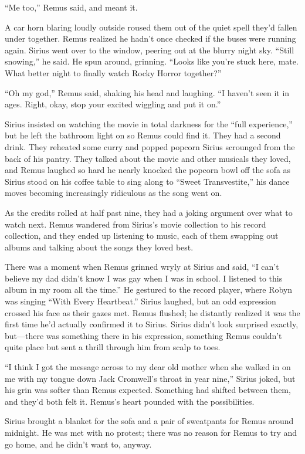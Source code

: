 “Me too,” Remus said, and meant it.

A car horn blaring loudly outside roused them out of the quiet spell they’d fallen under together. Remus realized he hadn’t once checked if the buses were running again. Sirius went over to the window, peering out at the blurry night sky. “Still snowing,” he said. He spun around, grinning. “Looks like you’re stuck here, mate. What better night to finally watch Rocky Horror together?”

“Oh my god,” Remus said, shaking his head and laughing. “I haven’t seen it in ages. Right, okay, stop your excited wiggling and put it on.”

Sirius insisted on watching the movie in total darkness for the “full experience,” but he left the bathroom light on so Remus could find it. They had a second drink. They reheated some curry and popped popcorn Sirius scrounged from the back of his pantry. They talked about the movie and other musicals they loved, and Remus laughed so hard he nearly knocked the popcorn bowl off the sofa as Sirius stood on his coffee table to sing along to “Sweet Transvestite,” his dance moves becoming increasingly ridiculous as the song went on.

As the credits rolled at half past nine, they had a joking argument over what to watch next. Remus wandered from Sirius’s movie collection to his record collection, and they ended up listening to music, each of them swapping out albums and talking about the songs they loved best.

There was a moment when Remus grinned wryly at Sirius and said, “I can’t believe my dad didn’t know I was gay when I was in school. I listened to this album in my room all the time.” He gestured to the record player, where Robyn was singing “With Every Heartbeat.” Sirius laughed, but an odd expression crossed his face as their gazes met. Remus flushed; he distantly realized it was the first time he’d actually confirmed it to Sirius. Sirius didn’t look surprised exactly, but—there was something there in his expression, something Remus couldn’t quite place but sent a thrill through him from scalp to toes.

“I think I got the message across to my dear old mother when she walked in on me with my tongue down Jack Cromwell’s throat in year nine,” Sirius joked, but his grin was softer than Remus expected. Something had shifted between them, and they’d both felt it. Remus’s heart pounded with the possibilities.

Sirius brought a blanket for the sofa and a pair of sweatpants for Remus around midnight. He was met with no protest; there was no reason for Remus to try and go home, and he didn’t want to, anyway.

